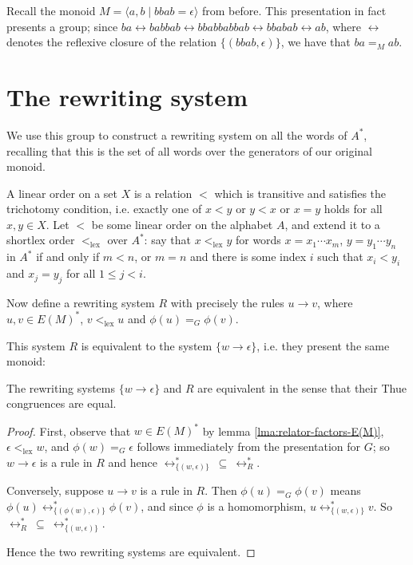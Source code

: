 \documentclass[nosubthm]{lmaths}
\newcommand{\ltlex}{<_{\mathrm{lex}}}
\begin{document}
\begin{example}
	Recall the monoid $M = \langle a, b \mid bbab = \epsilon \rangle$ from before. This presentation in fact presents a group; since $ba \leftrightarrow babbab \leftrightarrow bbabbabbab \leftrightarrow bbabab \leftrightarrow ab$, where $\leftrightarrow$ denotes the reflexive closure of the relation $\{(bbab, \epsilon)\}$, we have that $ba =_M ab$.
\end{example}

\section{The rewriting system}
We use this group to construct a rewriting system on all the words of $A^*$, recalling that this is the set of all words over the generators of our original monoid.

A linear order on a set $X$ is a relation $<$ which is transitive and satisfies the trichotomy condition, i.e. exactly one of $x < y$ or $y < x$ or $x = y$ holds for all $x, y \in X$. Let $<$ be some linear order on the alphabet $A$, and extend it to a shortlex order $\ltlex$ over $A^*$: say that $x \ltlex y$ for words $x = x_1\cdots x_m$, $y = y_1\cdots y_n$ in $A^*$ if and only if $m < n$, or $m = n$ and there is some index $i$ such that $x_i < y_i$ and $x_j = y_j$ for all $1 \le j < i$.

Now define a rewriting system $R$ with precisely the rules $u \to v$, where $u, v \in E(M)^*$, $v \ltlex u$ and $\phi(u) =_G \phi(v)$.

This system $R$ is equivalent to the system $\{w \to \epsilon\}$, i.e. they present the same monoid:

\begin{lemma} \label{lma:R-equivalent-to-pres}
	The rewriting systems $\{w \to \epsilon\}$ and $R$ are equivalent in the sense that their Thue congruences are equal.
\end{lemma}
\begin{proof}
First, observe that $w \in E(M)^*$ by lemma \ref{lma:relator-factors-E(M)}, $\epsilon \ltlex w$, and $\phi(w) =_G \epsilon$ follows immediately from the presentation for $G$; so $w \to \epsilon$ is a rule in $R$ and hence $\leftrightarrow^*_{\{(w,\epsilon)\}}\ \subseteq\ \leftrightarrow^*_R$.

Conversely, suppose $u \to v$ is a rule in $R$. Then $\phi(u) =_G \phi(v)$ means $\phi(u) \leftrightarrow^*_{\{(\phi(w), \epsilon)\}} \phi(v)$, and since $\phi$ is a homomorphism, $u \leftrightarrow^*_{\{(w, \epsilon)\}} v$. So $\leftrightarrow^*_R\ \subseteq\ \leftrightarrow^*_{\{(w,\epsilon)\}}$.

Hence the two rewriting systems are equivalent.
\end{proof}
\end{document}
